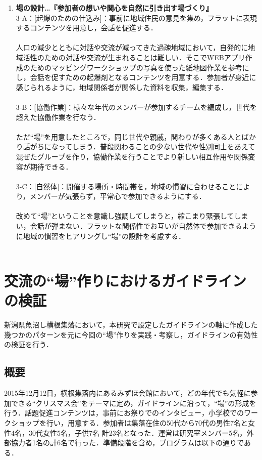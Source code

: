 \documentclass[a4paper]{jsarticle}
\begin{document}
\begin{enumerate}
\item
\textbf{場の設計…『参加者の想いや関心を自然に引き出す場づくり』}\\
3-A：[起爆のための仕込み]：事前に地域住民の意見を集め，フラットに表現するコンテンツを用意し，会話を促進する．\\\\

人口の減少とともに対話や交流が減ってきた過疎地域において，自発的に地域活性のための対話や交流が生まれることは難しい．そこでWEBアプリ作成のためのマッピングワークショップの写真を使った紙地図作業を参考にし，会話を促すための起爆剤となるコンテンツを用意する．参加者が身近に感じられるように，地域関係者が関係した資料を収集，編集する．\\\\

3-B：[協働作業]：様々な年代のメンバーが参加するチームを編成し，世代を超えた協働作業を行なう．\\\\
ただ“場”を用意したところで，同じ世代や親戚，関わりが多くある人とばかり話がちになってしまう．普段関わることの少ない世代や性別同士をあえて混ぜたグループを作り，協働作業を行うことでより新しい相互作用や関係変容が期待できる．\\\\
3-C：[自然体]：開催する場所・時間帯を，地域の慣習に合わせることにより，メンバーが気張らず，平常心で参加できるようにする．\\\\
改めて“場”ということを意識し強調してしまうと，縮こまり緊張してしまい，会話が弾まない．フラットな関係性でお互いが自然体で参加できるように地域の慣習をヒアリングし“場”の設計を考慮する．
\\\\
\end{enumerate}

\newpage
\section{交流の“場”作りにおけるガイドラインの検証}
新潟県魚沼し横根集落において，本研究で設定したガイドラインの軸に作成した幾つかのパターンを元に今回の“場”作りを実践・考察し，ガイドラインの有効性の検証を行う．

\subsection{概要}
2015年12月12日，横根集落内にあるみずほ会館において，どの年代でも気軽に参加できる“クリスマス会”をテーマに定め，ガイドラインに沿って，“場”の形成を行う．話題促進コンテンツは，事前にお祭りでのインタビュー，小学校でのワークショップを行い，用意する．参加者は集落在住の50代から70代の男性7名と女性4名，30代女性5名，子供7名 計23名となった．運営は研究室メンバー5名，外部協力者1名の計6名で行った．準備段階を含め，プログラムは以下の通りである．\\
\end{document}
